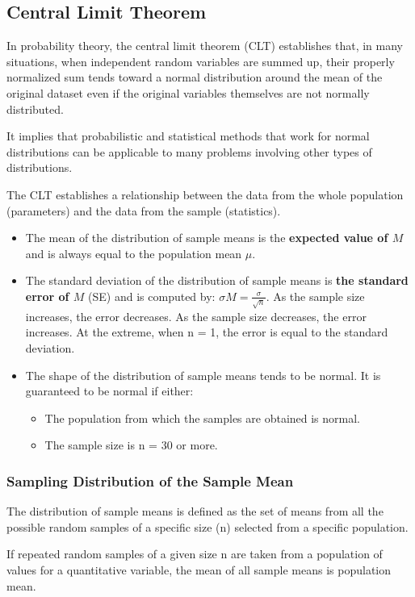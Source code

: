 \documentclass{article}
\begin{document}
\subsection{Central Limit Theorem}
In probability theory, the central limit theorem (CLT) establishes that, in many situations, when independent random variables are summed up, their properly normalized sum tends toward a normal distribution around the mean of the original dataset even if the original variables themselves are not normally distributed.

It implies that probabilistic and statistical methods that work for normal distributions can be applicable to many problems involving other types of distributions.

The CLT establishes a relationship between the data from the whole population (parameters) and the data from the sample (statistics). 

\begin{itemize}
    \item The mean of the distribution of sample means is the \textbf{expected value of $M$} and is always equal to the population mean $\mu$.
    \item The standard deviation of the distribution of sample means is \textbf{the standard error of $M$} (SE) and is computed by: $\sigma{M} = \frac{\sigma}{\sqrt{n}}$. As the sample size increases, the error decreases.  As the sample size decreases, the error increases.  At the extreme, when n = 1, the error is equal to the standard deviation.
    \item The shape of the distribution of sample means tends to be normal. It is guaranteed to be normal if either: 
    \begin{itemize}
        \item The population from which the samples are obtained is normal.
        \item The sample size is n = 30 or more.
    \end{itemize}  
\end{itemize}

\subsubsection{Sampling Distribution of the Sample Mean}
The distribution of sample means is defined as the set of means from all the possible random samples of a specific size (n) selected from a specific population. 

If repeated random samples of a given size n are taken from a population of values for a quantitative variable, the mean of all sample means is population mean.
\end{document}
